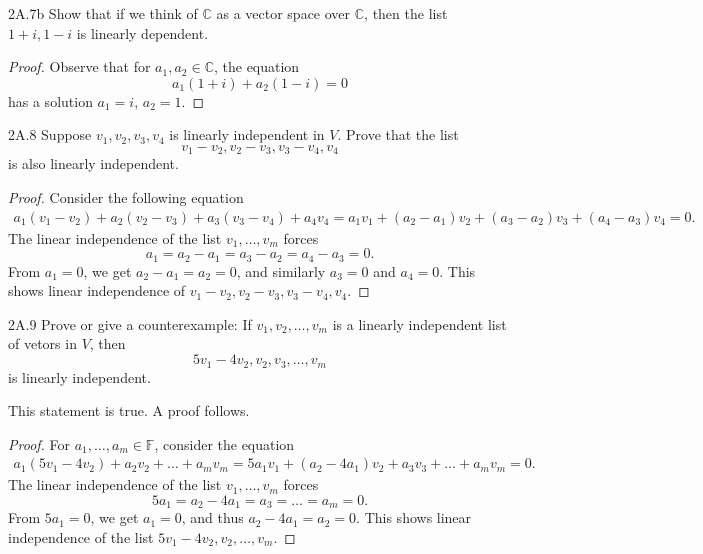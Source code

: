 \documentclass{exam}
\begin{document}
\begin{problem}{2A.7b}
    Show that if we think of $\mathbb C$ as a vector space over $\mathbb C$, then the list $1+i, 1-i$ is linearly dependent.
\end{problem}

\begin{proof}
    Observe that for $a_1, a_2\in\mathbb C$, the equation \[
        a_1(1 + i) + a_2(1 - i) = 0
    \]
    has a solution $a_1 = i$, $a_2 = 1$.
\end{proof}

\begin{problem}{2A.8}
    Suppose $v_1, v_2, v_3, v_4$ is linearly independent in $V$. Prove that the list \[
        v_1 - v_2, v_2 - v_3, v_3 - v_4, v_4
    \]
    is also linearly independent.
\end{problem}

\begin{proof}
    Consider the following equation
    \begin{align*}
        a_1(v_1 - v_2) + a_2(v_2 - v_3) + a_3(v_3 - v_4) + a_4v_4 = a_1v_1 + (a_2 - a_1)v_2 + (a_3 - a_2)v_3 + (a_4 - a_3)v_4 = 0.
    \end{align*}
    The linear independence of the list $v_1, \dots, v_m$ forces \[
        a_1 = a_2 - a_1 = a_3 - a_2 = a_4 - a_3 = 0.
    \]
    From $a_1 = 0$, we get $a_2 - a_1 = a_2 = 0$, and similarly $a_3 = 0$ and $a_4 = 0$. This shows linear independence of $v_1 - v_2, v_2 - v_3, v_3 - v_4, v_4$.
\end{proof}

\begin{problem}{2A.9}
    Prove or give a counterexample: If $v_1, v_2, \dots, v_m$ is a linearly independent list of vetors in $V$, then \[
        5v_1 - 4v_2, v_2, v_3,\dots, v_m
    \]
    is linearly independent.
\end{problem}
This statement is true. A proof follows.
\begin{proof}
    For $a_1, \dots, a_m\in\mathbb F$, consider the equation
    \begin{align*}
        a_1(5v_1 - 4v_2) + a_2v_2 + \dots + a_mv_m = 5a_1v_1 + (a_2 - 4a_1)v_2 + a_3v_3 + \dots + a_mv_m = 0.
    \end{align*}
    The linear independence of the list $v_1,\dots, v_m$ forces \[
        5a_1 = a_2 - 4a_1 = a_3 = \dots = a_m = 0.
    \]
    From $5a_1 = 0$, we get $a_1 = 0$, and thus $a_2 - 4a_1 = a_2 = 0$. This shows linear independence of the list $5v_1 - 4v_2, v_2, \dots, v_m$.
\end{proof}
\end{document}
